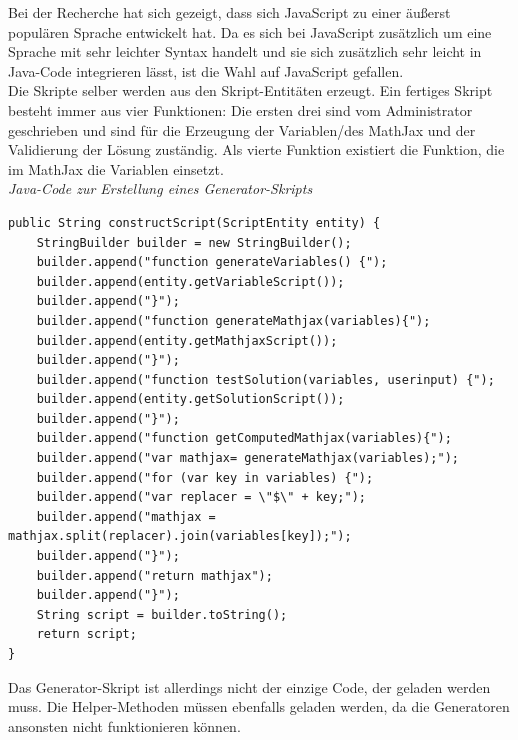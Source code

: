 Bei der Recherche hat sich gezeigt, dass sich JavaScript zu einer äußerst populären Sprache entwickelt hat. Da es sich bei JavaScript zusätzlich um eine Sprache mit sehr leichter Syntax handelt und sie sich zusätzlich sehr leicht in Java-Code integrieren lässt, ist die Wahl auf JavaScript gefallen. \\

Die Skripte selber werden aus den Skript-Entitäten erzeugt. Ein fertiges Skript besteht immer aus vier Funktionen: Die ersten drei sind vom Administrator geschrieben und sind für die Erzeugung der Variablen/des MathJax und der Validierung der Lösung zuständig. Als vierte Funktion existiert die Funktion, die im MathJax die Variablen einsetzt.\\

\emph{Java-Code zur Erstellung eines Generator-Skripts}
\begin{lstlisting}
public String constructScript(ScriptEntity entity) {
	StringBuilder builder = new StringBuilder();
	builder.append("function generateVariables() {");
	builder.append(entity.getVariableScript());
	builder.append("}");
	builder.append("function generateMathjax(variables){");
	builder.append(entity.getMathjaxScript());
	builder.append("}");
	builder.append("function testSolution(variables, userinput) {");
	builder.append(entity.getSolutionScript());
	builder.append("}");
	builder.append("function getComputedMathjax(variables){");
	builder.append("var mathjax= generateMathjax(variables);");
	builder.append("for (var key in variables) {");
	builder.append("var replacer = \"$\" + key;");
	builder.append("mathjax = mathjax.split(replacer).join(variables[key]);");
	builder.append("}");
	builder.append("return mathjax");
	builder.append("}");	
	String script = builder.toString();
	return script;
}
\end{lstlisting}

Das Generator-Skript ist allerdings nicht der einzige Code, der geladen werden muss. Die Helper-Methoden müssen ebenfalls geladen werden, da die Generatoren ansonsten nicht funktionieren können. \\

